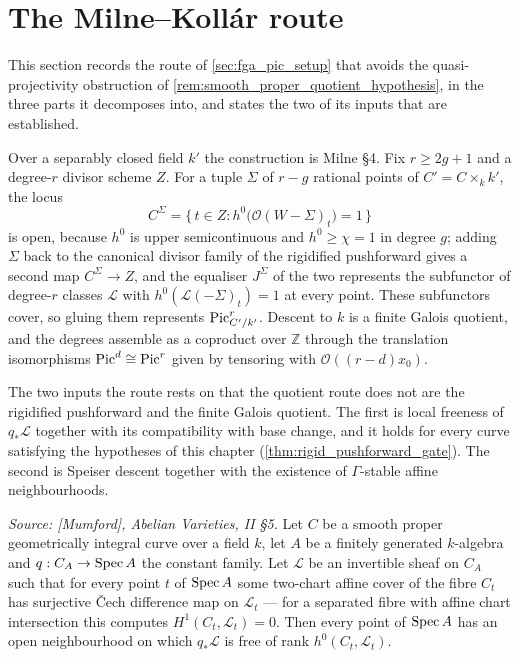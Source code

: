 \section{The Milne--Koll\'ar route}
\label{sec:fga_pic_milne_kollar}

This section records the route of \cref{sec:fga_pic_setup} that avoids the
quasi-projectivity obstruction of \cref{rem:smooth_proper_quotient_hypothesis},
in the three parts it decomposes into, and states the two of its inputs that are
established.

Over a separably closed field \(k'\) the construction is Milne \S 4. Fix
\(r \ge 2g+1\) and a degree-\(r\) divisor scheme \(Z\). For a tuple \(\Sigma\) of
\(r-g\) rational points of \(C' = C \times_k k'\), the locus
\[
  C^\Sigma
    = \{\, t \in Z : h^0\bigl(\mathcal{O}(W - \Sigma)_t\bigr) = 1 \,\}
\]
is open, because \(h^0\) is upper semicontinuous and \(h^0 \ge \chi = 1\) in
degree \(g\); adding \(\Sigma\) back to the canonical divisor family of the
rigidified pushforward gives a second map \(C^\Sigma \to Z\), and the equaliser
\(J^\Sigma\) of the two represents the subfunctor of degree-\(r\) classes
\(\mathcal{L}\) with \(h^0(\mathcal{L}(-\Sigma)_t) = 1\) at every point. These
subfunctors cover, so gluing them represents \(\operatorname{Pic}^r_{C'/k'}\). Descent to
\(k\) is a finite Galois quotient, and the degrees assemble as a coproduct over
\(\mathbb{Z}\) through the translation isomorphisms
\(\operatorname{Pic}^d \cong \operatorname{Pic}^r\) given by tensoring with \(\mathcal{O}((r-d) x_0)\).

The two inputs the route rests on that the quotient route does not are the
rigidified pushforward and the finite Galois quotient. The first is local freeness
of \(q_* \mathcal{L}\) together with its compatibility with base change, and it
holds for every curve satisfying the hypotheses of this chapter
(\cref{thm:rigid_pushforward_gate}). The second is Speiser descent together with
the existence of \(\Gamma\)-stable affine neighbourhoods.

\begin{theorem}\leanok
  \label{thm:rigid_pushforward_locally_free}
  \textit{Source: [Mumford], \emph{Abelian Varieties}, II \S 5.}
  Let \(C\) be a smooth proper geometrically integral curve over a field \(k\),
  let \(A\) be a finitely generated \(k\)-algebra and \(q : C_A \to \operatorname{Spec} A\) the
  constant family. Let \(\mathcal{L}\) be an invertible sheaf on \(C_A\) such that
  for every point \(t\) of \(\operatorname{Spec} A\) some two-chart affine cover of the fibre
  \(C_t\) has surjective {\v C}ech difference map on \(\mathcal{L}_t\) --- for a
  separated fibre with affine chart intersection this computes
  \(H^1(C_t, \mathcal{L}_t) = 0\). Then every point of \(\operatorname{Spec} A\) has an open
  neighbourhood on which \(q_* \mathcal{L}\) is free of rank
  \(h^0(C_t, \mathcal{L}_t)\).
\end{theorem}

